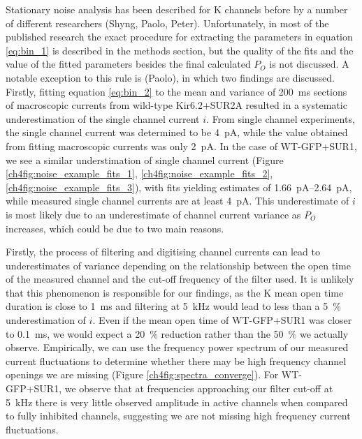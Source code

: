Stationary noise analysis has been described for K\ATP{} channels before by a number of different researchers (Shyng, Paolo, Peter).
Unfortunately, in most of the published research the exact procedure for extracting the parameters in equation \ref{eq:bin_1} is described in the methods section, but the quality of the fits and the value of the fitted parameters besides the final calculated $P_O$ is not discussed.
A notable exception to this rule is (Paolo), in which two findings are discussed.
Firstly, fitting equation \ref{eq:bin_2} to the mean and variance of \SI{200}{\milli\second} sections of macroscopic currents from wild-type Kir6.2+SUR2A resulted in a systematic underestimation of the single channel current $i$.
From single channel experiments, the single channel current was determined to be \SI{4}{\pico\ampere}, while the value obtained from fitting macroscopic currents was only \SI{2}{\pico\ampere}.
In the case of WT-GFP+SUR1, we see a similar understimation of single channel current (Figure \ref{ch4fig:noise_example_fits_1}, \ref{ch4fig:noise_example_fits_2}, \ref{ch4fig:noise_example_fits_3}), with fits yielding estimates of \SIrange{1.66}{2.64}{\pico\ampere}, while measured single channel currents are at least \SI{4}{\pico\ampere}.
This underestimate of $i$ is most likely due to an underestimate of channel current variance as $P_O$ increases, which could be due to two main reasons.

Firstly, the process of filtering and digitising channel currents can lead to underestimates of variance depending on the relationship between the open time of the measured channel and the cut-off frequency of the filter used.
It is unlikely that this phenomenon is responsible for our findings, as the K\ATP{} mean open time duration is close to \SI{1}{\milli\second} and filtering at \SI{5}{\kilo\hertz} would lead to less than a \SI{5}{\percent} underestimation of $i$.
Even if the mean open time of WT-GFP+SUR1 was closer to \SI{0.1}{\milli\second}, we would expect a \SI{20}{\percent} reduction rather than the \SI{50}{\percent} we actually observe.
Empirically, we can use the frequency power spectrum of our measured current fluctuations to determine whether there may be high frequency channel openings we are missing (Figure \ref{ch4fig:spectra_converge}).
For WT-GFP+SUR1, we observe that at frequencies approaching our filter cut-off at \SI{5}{\kilo\hertz} there is very little observed amplitude in active channels when compared to fully inhibited channels, suggesting we are not missing high frequency current fluctuations.

